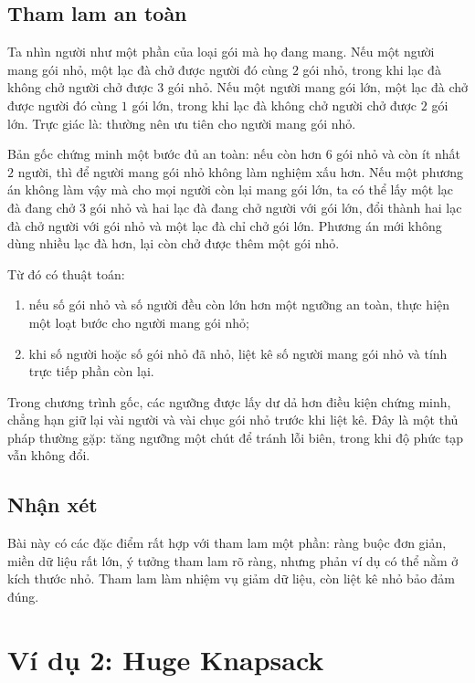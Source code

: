 \documentclass[11pt]{article}
\begin{document}
\subsection{Tham lam an toàn}

Ta nhìn người như một phần của loại gói mà họ đang mang. Nếu một người mang
gói nhỏ, một lạc đà chở được người đó cùng \(2\) gói nhỏ, trong khi lạc đà
không chở người chở được \(3\) gói nhỏ. Nếu một người mang gói lớn, một lạc đà
chở được người đó cùng \(1\) gói lớn, trong khi lạc đà không chở người chở
được \(2\) gói lớn. Trực giác là: thường nên ưu tiên cho người mang gói nhỏ.

Bản gốc chứng minh một bước đủ an toàn: nếu còn hơn \(6\) gói nhỏ và còn ít
nhất \(2\) người, thì để người mang gói nhỏ không làm nghiệm xấu hơn. Nếu một
phương án không làm vậy mà cho mọi người còn lại mang gói lớn, ta có thể lấy
một lạc đà đang chở \(3\) gói nhỏ và hai lạc đà đang chở người với gói lớn,
đổi thành hai lạc đà chở người với gói nhỏ và một lạc đà chỉ chở gói lớn.
Phương án mới không dùng nhiều lạc đà hơn, lại còn chở được thêm một gói nhỏ.

Từ đó có thuật toán:
\begin{enumerate}
  \item nếu số gói nhỏ và số người đều còn lớn hơn một ngưỡng an toàn, thực
  hiện một loạt bước cho người mang gói nhỏ;
  \item khi số người hoặc số gói nhỏ đã nhỏ, liệt kê số người mang gói nhỏ và
  tính trực tiếp phần còn lại.
\end{enumerate}

Trong chương trình gốc, các ngưỡng được lấy dư dả hơn điều kiện chứng minh,
chẳng hạn giữ lại vài người và vài chục gói nhỏ trước khi liệt kê. Đây là một
thủ pháp thường gặp: tăng ngưỡng một chút để tránh lỗi biên, trong khi độ phức
tạp vẫn không đổi.

\subsection{Nhận xét}

Bài này có các đặc điểm rất hợp với tham lam một phần: ràng buộc đơn giản,
miền dữ liệu rất lớn, ý tưởng tham lam rõ ràng, nhưng phản ví dụ có thể nằm ở
kích thước nhỏ. Tham lam làm nhiệm vụ giảm dữ liệu, còn liệt kê nhỏ bảo đảm
đúng.

\section{Ví dụ 2: Huge Knapsack}
\end{document}
